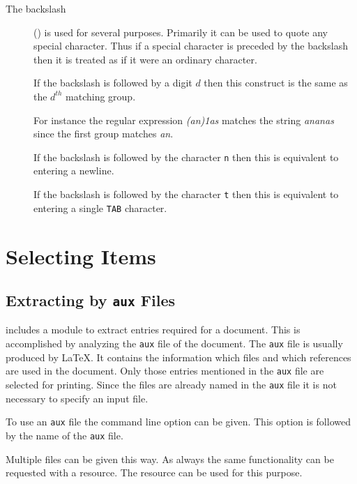 \documentclass[11pt,a4paper]{scrbook}
\begin{document}
\begin{description}
\item[The backslash] (\texttt{\BS}) is used for several purposes. Primarily it
  can be used to quote any special character. Thus if a special character is
  preceded by the backslash then it is treated as if it were an ordinary
  character.
  
  If the backslash is followed by a digit \(d\)\/ then this construct is the
  same as the \(d^{th}\) matching group.
  
  For instance the regular expression \emph{(an)\BS1as} matches the string
  \emph{ananas} since the first group matches \emph{an}.
  
  If the backslash is followed by the character \texttt{n} then this is
  equivalent to entering a newline.
  
  If the backslash is followed by the character \texttt{t} then this is
  equivalent to entering a single \texttt{TAB} character.

\end{description}


\section{Selecting Items}

\subsection{Extracting by \texttt{aux} Files}

\BibTool{} includes a module to extract \BibTeX{} entries required for a
document. This is accomplished by analyzing the \texttt{aux} file of the
document. The \texttt{aux} file is usually produced by \LaTeX. It contains the
information which \BibTeX{} files and which references are used in the
document. Only those entries mentioned in the \texttt{aux} file are selected
for printing. Since the \BibTeX{} files are already named in the \texttt{aux}
file it is not necessary to specify an input file.

To use an \texttt{aux} file the command line option  can be given. This
option is followed by the name of the \texttt{aux} file.


Multiple files can be given this way. As always the same functionality can be
requested with a resource. The resource  can be used for
this purpose.
\end{document}

